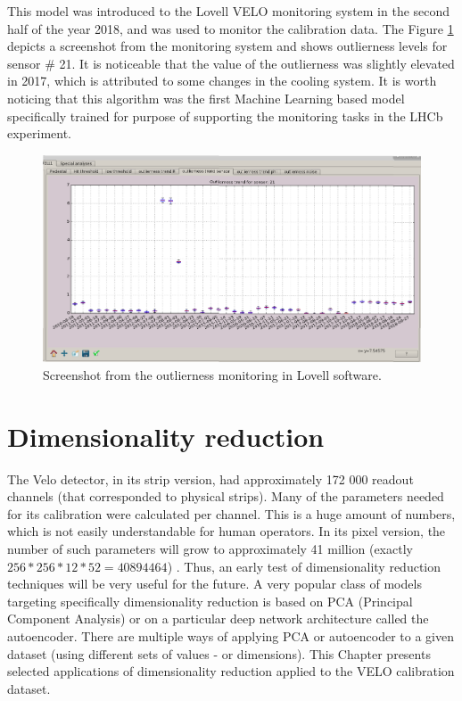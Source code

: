 This model was introduced to the Lovell VELO monitoring system in the second half of the year 2018, and was used to monitor the calibration data. The Figure \ref{plot:gui} depicts a screenshot from the monitoring system and shows outlierness levels for sensor \# 21. It is noticeable that the value of the outlierness was slightly elevated in 2017, which is attributed to some changes in the cooling system. It is worth noticing that this algorithm was the first Machine Learning based model specifically trained for purpose of supporting the monitoring tasks in the LHCb experiment. 


\begin{figure}
    \centering
    \includegraphics[width=0.7\linewidth]{figures/chapter4/outlierness/calina_lovell_screenshot.png}
    \caption{Screenshot from the outlierness monitoring in Lovell software.}
    \label{plot:gui}
  \end{figure}








\section{Dimensionality reduction}
\label{chap4:dimred}

The Velo detector, in its strip version, had approximately 172 000 readout channels (that corresponded to physical strips). Many of the parameters needed for its calibration were calculated per channel. This is a huge amount of numbers, which is not easily understandable for human operators.
In its pixel version, the number of such parameters will grow to approximately 41 million (exactly $256*256*12*52 = 40894464$) \cite{Collaboration:1624070}.
Thus, an early test of dimensionality reduction techniques will be very useful for the future. A very popular class of models targeting specifically dimensionality reduction is based on PCA (Principal Component Analysis) or on a particular deep network architecture called the autoencoder.
There are multiple ways of applying PCA or autoencoder to a given dataset (using different sets of values - or dimensions).
This Chapter presents selected applications of dimensionality reduction applied to the VELO calibration dataset.


